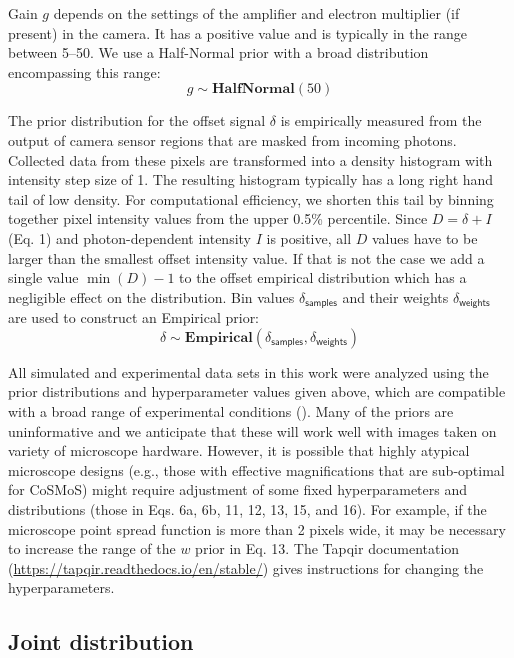 Gain $g$ depends on the settings of the amplifier and electron multiplier (if present) in the camera. It has a positive value and is typically in the range between 5--50. We use a Half-Normal prior with a broad distribution encompassing this range:
%
\begin{equation}
    g \sim \mathbf{HalfNormal}(50)
\end{equation}

The prior distribution for the offset signal $\delta$ is empirically measured from the output of camera sensor regions that are masked from incoming photons. Collected data from these pixels are transformed into a density histogram with intensity step size of 1. The resulting histogram typically has a long right hand tail of low density. For computational efficiency, we shorten this tail by binning together pixel intensity values from the upper 0.5\% percentile. Since $D = \delta + I$ (Eq. 1) and photon-dependent intensity $I$ is positive, all $D$ values have to be larger than the smallest offset intensity value. If that is not the case we add a single value $\min(D) - 1$ to the offset empirical distribution which has a negligible effect on the distribution. Bin values $\delta_\mathsf{samples}$ and their weights $\delta_\mathsf{weights}$ are used to construct an Empirical prior:
%
\begin{equation}
    \delta \sim \mathbf{Empirical}(\delta_\mathsf{samples}, \delta_\mathsf{weights})
\end{equation}

All simulated and experimental data sets in this work were analyzed using the prior distributions and hyperparameter values given above, which are compatible with a broad range of experimental conditions (). Many of the priors are uninformative  and we anticipate that these will work well with images taken on variety of microscope hardware.  However, it is possible that highly atypical microscope designs (e.g., those with effective magnifications that are sub-optimal for CoSMoS) might require adjustment of some fixed hyperparameters and distributions (those in Eqs. 6a, 6b, 11, 12, 13, 15, and 16). For example, if the microscope point spread function is more than 2 pixels wide, it may be necessary to increase the range of the $w$ prior in Eq. 13.  The Tapqir documentation (\url{https://tapqir.readthedocs.io/en/stable/}) gives instructions for changing the hyperparameters.

\subsection{Joint distribution}

